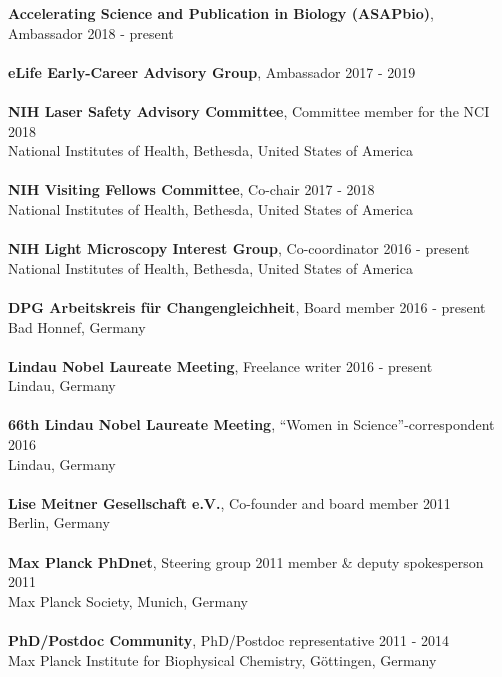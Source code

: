 \documentclass[margin,line]{res}
\begin{document}
\begin{resume}
{\bf Accelerating Science and Publication in Biology (ASAPbio)}, Ambassador \hfill {2018 - present}\\
\vspace*{-3mm}\\
{\bf eLife Early-Career Advisory Group}, Ambassador \hfill {2017 - 2019}\\
\vspace*{-3mm}\\
{\bf NIH Laser Safety Advisory Committee}, Committee member for the NCI \hfill {2018}\\
National Institutes of Health, Bethesda, United States of America\\
\vspace*{-3mm}\\
{\bf NIH Visiting Fellows Committee}, Co-chair \hfill {2017 - 2018}\\
National Institutes of Health, Bethesda, United States of America\\
\vspace*{-3mm}\\
{\bf NIH Light Microscopy Interest Group}, Co-coordinator \hfill {2016 - present}\\
National Institutes of Health, Bethesda, United States of America\\
\vspace*{-3mm}\\
{\bf DPG Arbeitskreis für Changengleichheit}, Board member \hfill {2016 - present}\\
Bad Honnef, Germany\\
\vspace*{-3mm}\\
{\bf Lindau Nobel Laureate Meeting}, Freelance writer \hfill {2016 - present}\\
Lindau, Germany\\
\vspace*{-3mm}\\
{\bf 66th Lindau Nobel Laureate Meeting}, “Women in Science”-correspondent \hfill {2016}\\
Lindau, Germany\\
\vspace*{-3mm}\\
{\bf Lise Meitner Gesellschaft e.V.}, Co-founder and board member \hfill {2011}\\
Berlin, Germany\\
\vspace*{-3mm}\\
{\bf Max Planck PhDnet}, Steering group 2011 member \& deputy spokesperson \hfill {2011}\\
Max Planck Society, Munich, Germany\\
\vspace*{-3mm}\\
{\bf PhD/Postdoc Community}, PhD/Postdoc representative \hfill {2011 - 2014}\\
Max Planck Institute for Biophysical Chemistry, Göttingen, Germany\\


\end{resume}
\end{document}
